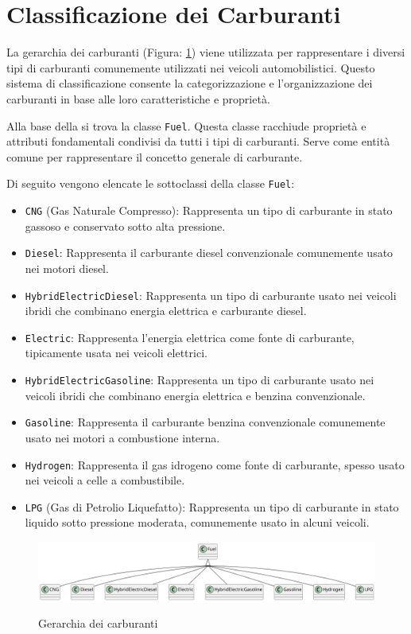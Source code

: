 \section{Classificazione dei Carburanti}

La gerarchia dei carburanti (Figura: \ref{fig:carpedia-fuel}) viene utilizzata per rappresentare i diversi tipi di carburanti comunemente utilizzati nei veicoli automobilistici. Questo sistema di classificazione consente la categorizzazione e l'organizzazione dei carburanti in base alle loro caratteristiche e proprietà.

Alla base della si trova la classe \texttt{Fuel}. Questa classe racchiude proprietà e attributi fondamentali condivisi da tutti i tipi di carburanti. Serve come entità comune per rappresentare il concetto generale di carburante.

Di seguito vengono elencate le sottoclassi della classe \texttt{Fuel}:

\begin{itemize}
    \item \texttt{CNG} (Gas Naturale Compresso): Rappresenta un tipo di carburante in stato gassoso e conservato sotto alta pressione.
    \item \texttt{Diesel}: Rappresenta il carburante diesel convenzionale comunemente usato nei motori diesel.
    \item \texttt{HybridElectricDiesel}: Rappresenta un tipo di carburante usato nei veicoli ibridi che combinano energia elettrica e carburante diesel.
    \item \texttt{Electric}: Rappresenta l'energia elettrica come fonte di carburante, tipicamente usata nei veicoli elettrici.
    \item \texttt{HybridElectricGasoline}: Rappresenta un tipo di carburante usato nei veicoli ibridi che combinano energia elettrica e benzina convenzionale.
    \item \texttt{Gasoline}: Rappresenta il carburante benzina convenzionale comunemente usato nei motori a combustione interna.
    \item \texttt{Hydrogen}: Rappresenta il gas idrogeno come fonte di carburante, spesso usato nei veicoli a celle a combustibile.
    \item \texttt{LPG} (Gas di Petrolio Liquefatto): Rappresenta un tipo di carburante in stato liquido sotto pressione moderata, comunemente usato in alcuni veicoli.
\end{itemize}

\begin{figure}
    \caption{Gerarchia dei carburanti}
    \includegraphics[width=\textwidth]{figures/carpedia-fuel.png}
    \label{fig:carpedia-fuel}
\end{figure}

